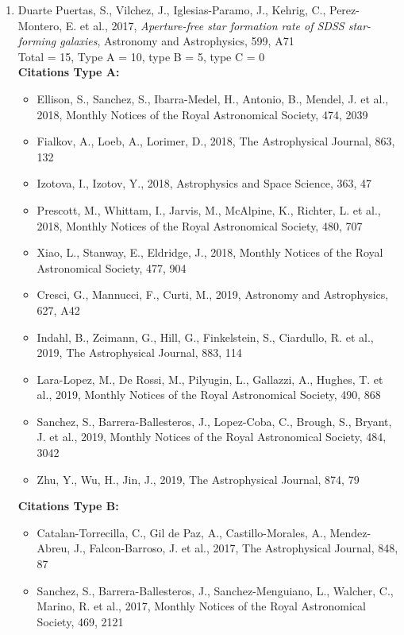 \documentclass{letter}
\begin{document}
\begin{enumerate}
\begin{itemize}
\end{itemize}
\item Duarte Puertas, S., Vilchez, J., Iglesias-Paramo, J., Kehrig, C., Perez-Montero, E. et al., 2017, {\it Aperture-free star formation rate of SDSS star-forming galaxies}, Astronomy and Astrophysics, 599, A71 \\ 
Total = 15, Type A = 10, type B = 5, type C = 0 \\ 
{\bf Citations Type A:}
\begin{itemize}
\item Ellison, S., Sanchez, S., Ibarra-Medel, H., Antonio, B., Mendel, J. et al., 2018, Monthly Notices of the Royal Astronomical Society, 474, 2039
\item Fialkov, A., Loeb, A., Lorimer, D., 2018, The Astrophysical Journal, 863, 132
\item Izotova, I., Izotov, Y., 2018, Astrophysics and Space Science, 363, 47
\item Prescott, M., Whittam, I., Jarvis, M., McAlpine, K., Richter, L. et al., 2018, Monthly Notices of the Royal Astronomical Society, 480, 707
\item Xiao, L., Stanway, E., Eldridge, J., 2018, Monthly Notices of the Royal Astronomical Society, 477, 904
\item Cresci, G., Mannucci, F., Curti, M., 2019, Astronomy and Astrophysics, 627, A42
\item Indahl, B., Zeimann, G., Hill, G., Finkelstein, S., Ciardullo, R. et al., 2019, The Astrophysical Journal, 883, 114
\item Lara-Lopez, M., De Rossi, M., Pilyugin, L., Gallazzi, A., Hughes, T. et al., 2019, Monthly Notices of the Royal Astronomical Society, 490, 868
\item Sanchez, S., Barrera-Ballesteros, J., Lopez-Coba, C., Brough, S., Bryant, J. et al., 2019, Monthly Notices of the Royal Astronomical Society, 484, 3042
\item Zhu, Y., Wu, H., Jin, J., 2019, The Astrophysical Journal, 874, 79
\end{itemize}
{\bf Citations Type B:}
\begin{itemize}
\item Catalan-Torrecilla, C., Gil de Paz, A., Castillo-Morales, A., Mendez-Abreu, J., Falcon-Barroso, J. et al., 2017, The Astrophysical Journal, 848, 87
\item Sanchez, S., Barrera-Ballesteros, J., Sanchez-Menguiano, L., Walcher, C., Marino, R. et al., 2017, Monthly Notices of the Royal Astronomical Society, 469, 2121

\end{itemize}
\end{enumerate}
\end{document}
